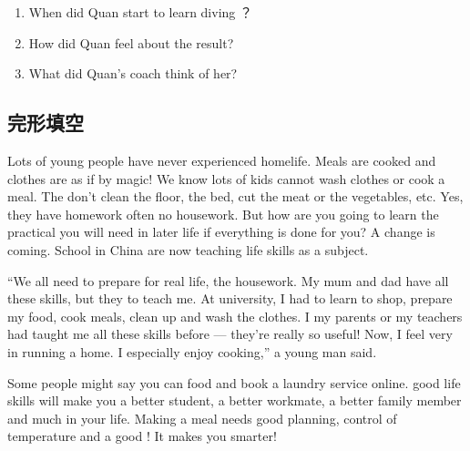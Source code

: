 \documentclass{ExamJHSEngl}
\begin{document}

\begin{enumerate}[resume,ref={\arabic*},labelsep=-0.1em,itemsep=0em]

  \item[\choice{B}] When did Quan start to learn diving ？
  
  \item[\choice{C}] How did Quan feel about the result?
  
  \item[\choice{C}] What did Quan's coach think of her?

\end{enumerate}


\subsection{完形填空}

\setcounter{enumi}{21}
\countercontinue

Lots of young people have never experienced homelife. Meals are cooked and clothes are \cloze as if by magic! We know lots of kids cannot wash clothes or cook a meal. The don’t clean the floor, \cloze the bed, cut the meat or the vegetables, etc. Yes, they have homework \cloze often no housework. But how are you going to learn the practical \cloze you will need in later life if everything is done for you? A change is coming. School in China are now \cloze teaching life skills as a subject. 

“We all need to prepare for real life, \cloze the housework. My mum and dad have all these skills, but they \cloze to teach me. At university, I had to learn to shop, prepare my food, cook meals, clean up and wash the clothes. I \cloze my parents or my teachers had taught me all these skills before — they're really so useful! Now, I feel very \cloze in running a home. I especially enjoy cooking,” a young man said.

Some people might say you can \cloze food and book a laundry service online. \cloze good life skills will make you a better student, a better workmate, a better family member and much \cloze in your life. Making a meal needs good planning, control of temperature and a good \cloze ! It makes you smarter!
\end{document}
